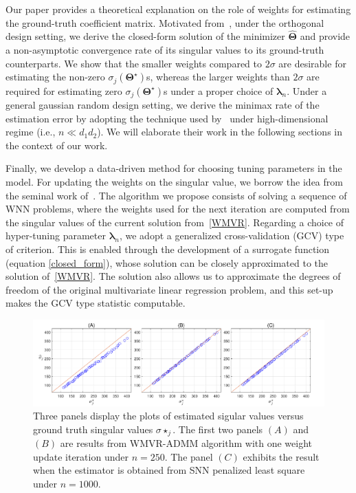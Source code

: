 \documentclass[alpha-refs]{wiley-article}
\begin{document}
Our paper provides a theoretical explanation on the role of weights for estimating the ground-truth coefficient matrix.
Motivated from~\citet{yuan2007dimension}, under the orthogonal design setting, we derive the closed-form solution of the minimizer $\widehat{\boldsymbol{\Theta}}$ and provide a non-asymptotic convergence rate of its singular values to its ground-truth counterparts.
We show that the smaller weights compared to $2\sigma$ are desirable for estimating the non-zero $\sigma_{j}(\boldsymbol{\Theta}^{\star})$s, whereas the larger weights than $2\sigma$ are required for estimating zero $\sigma_{j}(\boldsymbol{\Theta}^{\star})$s under a proper choice of $\boldsymbol{\lambda}_{n}$.
Under a general gaussian random design setting, we derive the minimax rate of the estimation error by adopting the technique used by~\citet{negahban2011estimation} under high-dimensional regime (i.e., $n \ll d_{1}d_{2}$).
We will elaborate their work in the following sections in the context of our work.

Finally, we develop a data-driven method for choosing tuning parameters in the model.
For updating the weights on the singular value, we borrow the idea from the seminal work of~\citet{candes2008enhancing}.
The algorithm we propose consists of solving a sequence of WNN problems, where the weights used for the next iteration are computed from the singular values of the current solution from~\eqref{WMVR}.
Regarding a choice of hyper-tuning parameter $\boldsymbol{\lambda}_{n}$, we adopt a generalized cross-validation (GCV) type of criterion.
This is enabled through the development of a surrogate function (equation \eqref{closed_form}), whose solution can be closely approximated to the solution of~\eqref{WMVR}. The solution also allows us to approximate the degrees of freedom of the original multivariate linear regression problem,  and this set-up makes the GCV type statistic computable.

\begin{figure}
  \includegraphics[width=150mm]{Figure/Fig1.pdf}
  \centering
  \caption{Three panels display the plots of estimated sigular values versus ground truth singular values $\sigma{\star}_{j}$.
  The first two panels $(A)$ and $(B)$ are results from WMVR-ADMM algorithm with one weight update iteration under $n=250$.
  The panel $(C)$ exhibits the result when the estimator is obtained from SNN penalized least square under $n=1000$. }
  \label{Fig1}
\end{figure}
\end{document}
